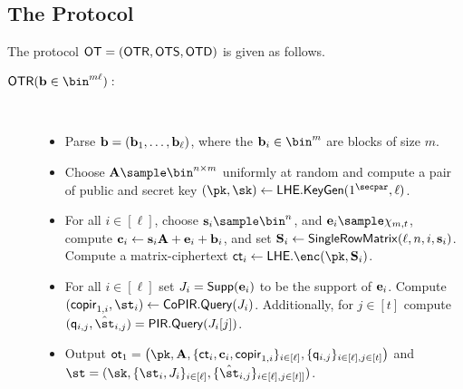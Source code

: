 \subsection{The Protocol}
\label{subsec:OTprotocol}

The protocol $\mathsf{OT} = (\mathsf{OTR},\mathsf{OTS},\mathsf{OTD})$ is given as follows.
\begin{description}
\item[$\OTR(\vc{b} \in \bin^{m \ell}):$]~
\begin{itemize}
    \item Parse $\mathbf{b} = (\mathbf{b}_1,\dots,\mathbf{b}_\ell)$, where the $\vc{b}_i \in \bin^m$ are blocks of size $m$.
    \item Choose $\vc{A}\sample \bin^{n\times m}$ uniformly at random and compute a pair of public and secret key $(\pk,\sk)\gets\LHE.\keygen(1^\secpar,\ell)$.
    \item For all $i\in[\ell]$, choose $\vc{s}_i \sample \bin^n$, and $\en_i \sample \errordist_{m,t}$, compute $\mathbf{c}_i \gets \mathbf{s}_i\mathbf{A}+\mathbf{e}_i+\mathbf{b}_i$, and set $\mathbf{S}_i \gets \mathsf{SingleRowMatrix}(\ell,n,i,\mathbf{s}_i)$. Compute a matrix-ciphertext $\ct_i \gets \LHE.\enc(\pk,\vc{S}_i)$.
    \item For all $i\in[\ell]$ set $J_i = \mathsf{Supp}(\mathbf{e}_i)$ to be the support of $\mathbf{e}_i$. Compute $(\copir_{1,i},\st_i)\gets \CoPIR.\query(J_i)$. Additionally, for $j \in [t]$ compute $(\quer_{i,j},\hat{\st}_{i,j}) = \PIR.\query(J_i[j])$.
     \item Output $\ot_1=\left(\pk,\vc{A},\{\ct_i, \vc{c}_i,\copir_{1,i}\}_{i\in [\ell]},\{\quer_{i,j}\}_{i \in [\ell], j \in [t]}\right)$ and $\st = (\sk,\{\st_i,J_i\}_{i \in [\ell]},\{\hat{\st}_{i,j}\}_{i \in [\ell], j \in [t]]})$.
\end{itemize}


\end{description}
